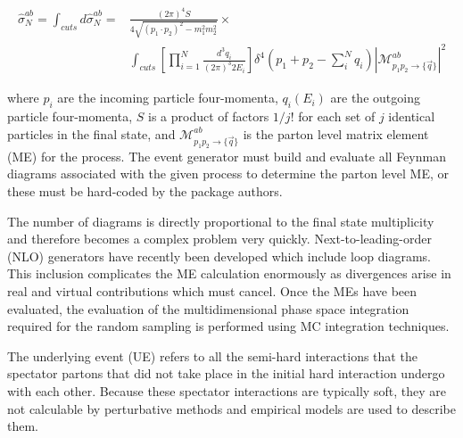 \begin{equation}
\begin{split}
\hat{\sigma}_{N}^{ab}=\int_{cuts}d\hat{\sigma}_{N}^{ab}={}&\frac{\left(2\pi\right)^{4}S}{4\sqrt{\left(p_{1}{\cdot}p_{2}\right)^{2}-m_{1}^{2}m_{2}^{2}}}\times \\ &\int_{cuts} \left[\prod_{i=1}^{N}\frac{d^{3}q_{i}}{\left(2\pi\right)^{3}2E_{i}}\right]\delta^{4}\left(p_{1}+p_{2}-\sum_{i}^{N}q_{i}\right)|\mathcal{M}_{p_{1}p_{2}\rightarrow\{\vec{q}\}}^{ab}|^{2}
\end{split}
\end{equation}

where $p_{i}$ are the incoming particle four-momenta, $q_{i}(E_{i})$ are the outgoing particle four-momenta, $S$ is a product of factors $1/j!$ for each set of $j$ identical particles in the final state, and $\mathcal{M}_{p_{1}p_{2}\rightarrow\{\vec{q}\}}^{ab}$ is the parton level matrix element (ME) for the process. The event generator must build and evaluate all Feynman diagrams associated with the given process to determine the parton level ME, or these must be hard-coded by the package authors. 

The number of diagrams is directly proportional to the final state multiplicity and therefore becomes a complex problem very quickly. Next-to-leading-order (NLO) generators have recently been developed which include loop diagrams. This inclusion complicates the ME calculation enormously as divergences arise in real and virtual contributions which must cancel. Once the MEs have been evaluated, the evaluation of the multidimensional phase space integration required for the random sampling is performed using MC integration techniques\cite{Binder_1997}. 

The underlying event (UE) refers to all the semi-hard interactions that the spectator partons that did not take place in the initial hard interaction undergo with each other. Because these spectator interactions are typically soft, they are not calculable by perturbative methods and empirical models are used to describe them.

